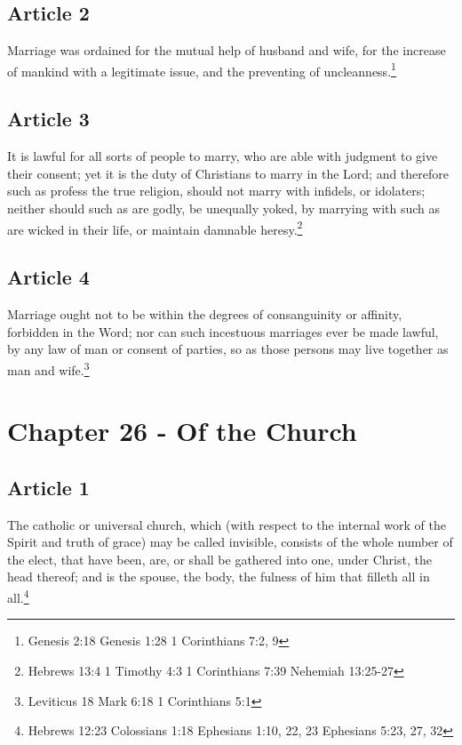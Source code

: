 \documentclass[12pt,letterpaper]{book}
\begin{document}
\section{Article 2}

Marriage was ordained for the mutual help of husband and wife, for the increase of mankind with a legitimate issue, and the preventing of uncleanness.\footnote{Genesis 2:18 Genesis 1:28 1 Corinthians 7:2, 9}

\section{Article 3}

It is lawful for all sorts of people to marry, who are able with judgment to give their consent; yet it is the duty of Christians to marry in the Lord; and therefore such as profess the true religion, should not marry with infidels, or idolaters; neither should such as are godly, be unequally yoked, by marrying with such as are wicked in their life, or maintain damnable heresy.\footnote{Hebrews 13:4 1 Timothy 4:3 1 Corinthians 7:39 Nehemiah 13:25-27}

\section{Article 4}

Marriage ought not to be within the degrees of consanguinity or affinity, forbidden in the Word; nor can such incestuous marriages ever be made lawful, by any law of man or consent of parties, so as those persons may live together as man and wife.\footnote{Leviticus 18 Mark 6:18 1 Corinthians 5:1}

\chapter{Chapter 26 - Of the Church}
\section{Article 1}

The catholic or universal church, which (with respect to the internal work of the Spirit and truth of grace) may be called invisible, consists of the whole number of the elect, that have been, are, or shall be gathered into one, under Christ, the head thereof; and is the spouse, the body, the fulness of him that filleth all in all.\footnote{Hebrews 12:23 Colossians 1:18 Ephesians 1:10, 22, 23 Ephesians 5:23, 27, 32}
\end{document}
